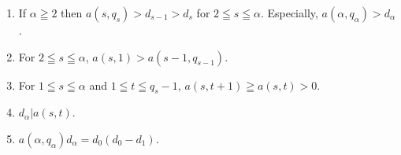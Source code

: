 \begin{lemma*}
\begin{enumerate}
  \item If $\alpha\geqq 2$ then $a(s,q_{s})>d_{s-1}>d_{s}$ for $2\leqq
    s\leqq \alpha$. Especially, $a(\alpha,q_{\alpha})>d_{\alpha}$.
    
  \item For $2\leqq s\leqq \alpha$, $a(s,1)>a(s-1,q_{s-1})$.
    
  \item For $1\leqq s\leqq \alpha$ and $1\leqq t\leqq q_{s}-1$,
    $a(s,t+1)\geqq a(s,t)>0$.
    
  \item $d_{\alpha}|a(s,t)$.
    
  \item $a(\alpha,q_{\alpha})d_{\alpha}=d_{0}(d_{0}-d_{1})$.
  \end{enumerate}
\end{lemma*}

